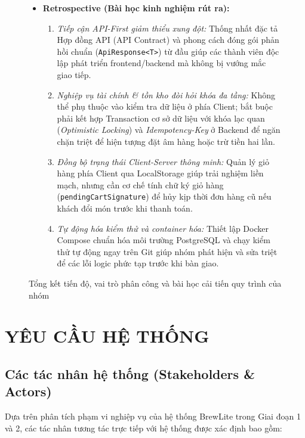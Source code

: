 \documentclass[12pt,a4paper,oneside]{report}
\begin{document}
\begin{figure}[H]
\begin{tcolorbox}[colback=gray!5,colframe=gray!50,title=Ghi nhận tiến độ và số liệu thực tế của Nhóm]
\begin{itemize}[leftmargin=1.5cm]
  \item \textbf{Retrospective (Bài học kinh nghiệm rút ra):}
  \begin{enumerate}[label=\alph*),leftmargin=0.8cm]
    \item \textit{Tiếp cận API-First giảm thiểu xung đột:} Thống nhất đặc tả Hợp đồng API (API Contract) và phong cách đóng gói phản hồi chuẩn (\texttt{ApiResponse<T>}) từ đầu giúp các thành viên độc lập phát triển frontend/backend mà không bị vướng mắc giao tiếp.
    \item \textit{Nghiệp vụ tài chính \& tồn kho đòi hỏi khóa đa tầng:} Không thể phụ thuộc vào kiểm tra dữ liệu ở phía Client; bắt buộc phải kết hợp Transaction cơ sở dữ liệu với khóa lạc quan (\textit{Optimistic Locking}) và \textit{Idempotency-Key} ở Backend để ngăn chặn triệt để hiện tượng đặt âm hàng hoặc trừ tiền hai lần.
    \item \textit{Đồng bộ trạng thái Client-Server thông minh:} Quản lý giỏ hàng phía Client qua LocalStorage giúp trải nghiệm liền mạch, nhưng cần cơ chế tính chữ ký giỏ hàng (\texttt{pendingCartSignature}) để hủy kịp thời đơn hàng cũ nếu khách đổi món trước khi thanh toán.
    \item \textit{Tự động hóa kiểm thử và container hóa:} Thiết lập Docker Compose chuẩn hóa môi trường PostgreSQL và chạy kiểm thử tự động ngay trên Git giúp nhóm phát hiện và sửa triệt để các lỗi logic phức tạp trước khi bàn giao.
  \end{enumerate}
\end{itemize}
\end{tcolorbox}
\caption{Tổng kết tiến độ, vai trò phân công và bài học cải tiến quy trình của nhóm}
\label{fig:team-progress-metrics}
\end{figure}



\chapter{YÊU CẦU HỆ THỐNG}

\section{Các tác nhân hệ thống (Stakeholders \& Actors)}
Dựa trên phân tích phạm vi nghiệp vụ của hệ thống BrewLite trong Giai đoạn 1 và 2, các tác nhân tương tác trực tiếp với hệ thống được xác định bao gồm:
\end{document}
